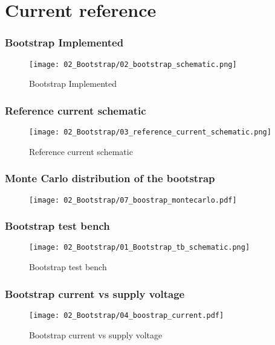 \documentclass[xcolor=dvipsnames,envcountsect]{beamer}
\begin{document}
% 
	
\section{Current reference}

\begin{frame}
	\frametitle{Bootstrap Implemented}
	\begin{figure}[ht]
		\centering
		\texttt{[image: 02\_Bootstrap/02\_bootstrap\_schematic.png]}
		\caption{Bootstrap Implemented}
	\end{figure}
\end{frame}
\begin{frame}
	\frametitle{Reference current schematic}
	\begin{figure}[ht]
		\centering
		\texttt{[image: 02\_Bootstrap/03\_reference\_current\_schematic.png]}
		\caption{Reference current schematic}
	\end{figure}
\end{frame}

\begin{frame}
	\frametitle{Monte Carlo distribution of the bootstrap}
	\begin{figure}[ht]
		\centering
		\texttt{[image: 02\_Bootstrap/07\_boostrap\_montecarlo.pdf]}
	\end{figure}
\end{frame}




\begin{frame}
	\frametitle{Bootstrap test bench}
	\begin{figure}[ht]
		\centering
		\texttt{[image: 02\_Bootstrap/01\_Bootstrap\_tb\_schematic.png]}
		\caption{Bootstrap test bench}
	\end{figure}
\end{frame}

\begin{frame}
	\frametitle{Bootstrap current vs supply voltage}
	\begin{figure}[ht]
		\centering
		\texttt{[image: 02\_Bootstrap/04\_boostrap\_current.pdf]}
		\caption{Bootstrap current vs supply voltage}
	\end{figure}
\end{frame}
\end{document}
